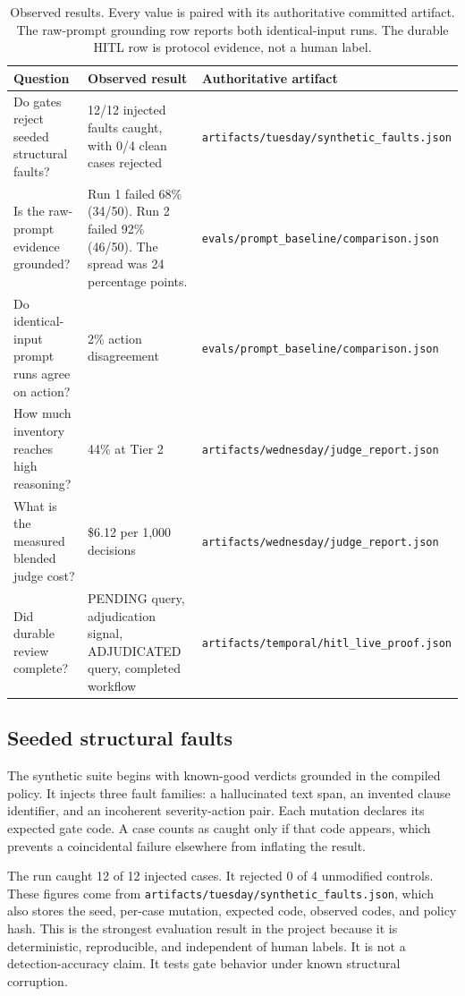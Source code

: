 \documentclass{article}
\newcommand{\artifact}[1]{\nolinkurl{#1}}
\begin{document}
\begin{table}[t]
\centering
\caption{Observed results. Every value is paired with its authoritative committed artifact. The
raw-prompt grounding row reports both identical-input runs. The durable HITL row is protocol evidence,
not a human label.}
\label{tab:results}
\begin{tabular}{@{}L{0.23\textwidth}L{0.28\textwidth}L{0.42\textwidth}@{}}
\toprule
Question & Observed result & Authoritative artifact \\
\midrule
Do gates reject seeded structural faults? & 12/12 injected faults caught, with 0/4 clean cases rejected &
\artifact{artifacts/tuesday/synthetic_faults.json} \\
Is the raw-prompt evidence grounded? & Run 1 failed 68\% (34/50). Run 2 failed 92\% (46/50).
The spread was 24 percentage points. &
\artifact{evals/prompt_baseline/comparison.json} \\
Do identical-input prompt runs agree on action? & 2\% action disagreement &
\artifact{evals/prompt_baseline/comparison.json} \\
How much inventory reaches high reasoning? & 44\% at Tier 2 &
\artifact{artifacts/wednesday/judge_report.json} \\
What is the measured blended judge cost? & \$6.12 per 1,000 decisions &
\artifact{artifacts/wednesday/judge_report.json} \\
Did durable review complete? & PENDING query, adjudication signal, ADJUDICATED query, completed workflow &
\artifact{artifacts/temporal/hitl_live_proof.json} \\
\bottomrule
\end{tabular}
\end{table}

\subsection{Seeded structural faults}

The synthetic suite begins with known-good verdicts grounded in the compiled policy. It injects
three fault families: a hallucinated text span, an invented clause identifier, and an incoherent
severity-action pair. Each mutation declares its expected gate code. A case counts as caught only if
that code appears, which prevents a coincidental failure elsewhere from inflating the result.

The run caught 12 of 12 injected cases. It rejected 0 of 4 unmodified controls. These figures come
from \artifact{artifacts/tuesday/synthetic_faults.json}, which also stores the seed, per-case mutation,
expected code, observed codes, and policy hash. This is the strongest evaluation result in the
project because it is deterministic, reproducible, and independent of human labels. It is not a
detection-accuracy claim. It tests gate behavior under known structural corruption.
\end{document}
